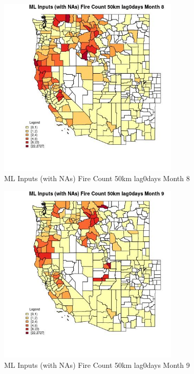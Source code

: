 \begin{figure} 
\centering  
\includegraphics[width=0.77\textwidth]{Code_Outputs/Report_ML_input_PM25_Step4_part_f_de_duplicated_aveswNAs_CountyFire_Count_50km_lag0daysmedianMonth8.jpg} 
\caption{\label{fig:Report_ML_input_PM25_Step4_part_f_de_duplicated_aveswNAsCountyFire_Count_50km_lag0daysmedianMonth8}ML Inputs (with NAs) Fire Count 50km lag0days Month 8} 
\end{figure} 
 

\clearpage 

\begin{figure} 
\centering  
\includegraphics[width=0.77\textwidth]{Code_Outputs/Report_ML_input_PM25_Step4_part_f_de_duplicated_aveswNAs_CountyFire_Count_50km_lag0daysmedianMonth9.jpg} 
\caption{\label{fig:Report_ML_input_PM25_Step4_part_f_de_duplicated_aveswNAsCountyFire_Count_50km_lag0daysmedianMonth9}ML Inputs (with NAs) Fire Count 50km lag0days Month 9} 
\end{figure} 
 

